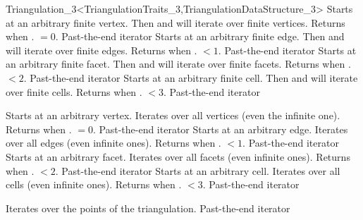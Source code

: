 \begin{ccRefClass}{Triangulation_3<TriangulationTraits_3,TriangulationDataStructure_3>}
{Starts at an arbitrary finite vertex. Then \ccc{++} and \ccc{--} will
iterate over finite vertices. Returns  when
\ccVar. $=0$.} 
\ccGlue
{}
{Past-the-end iterator}
\ccGlue
{}
{Starts at an arbitrary finite edge. Then \ccc{++} and \ccc{--} will
iterate over finite edges. Returns  when
\ccVar. $<1$.} 
\ccGlue
{}
{Past-the-end iterator}
\ccGlue
{}
{Starts at an arbitrary finite facet. Then \ccc{++} and \ccc{--} will
iterate over finite facets. Returns  when
\ccVar. $<2$.}
\ccGlue
{}
{Past-the-end iterator}
\ccGlue
{}
{Starts at an arbitrary finite cell. Then \ccc{++} and \ccc{--} will
iterate over finite cells. Returns  when
\ccVar. $<3$.}
\ccGlue
{}
{Past-the-end iterator}

{Starts at an arbitrary vertex. Iterates over all vertices (even the infinite
one). Returns  when
\ccVar. $=0$.}  
\ccGlue
{}
{Past-the-end iterator}
\ccGlue
{}
{Starts at an arbitrary edge. Iterates over all edges (even infinite
ones). Returns  when \ccVar. $<1$.}
\ccGlue
{}
{Past-the-end iterator}
\ccGlue
{}
{Starts at an arbitrary facet. Iterates over all facets (even infinite
ones). Returns  when 
\ccVar. $<2$.}
\ccGlue
{}
{Past-the-end iterator}
\ccGlue
{}
{Starts at an arbitrary cell. Iterates over all cells (even infinite
ones). Returns  when 
\ccVar. $<3$.}
\ccGlue
{}
{Past-the-end iterator}

{Iterates over the points of the triangulation.}
\ccGlue
{}
{Past-the-end iterator}


\end{ccRefClass}
